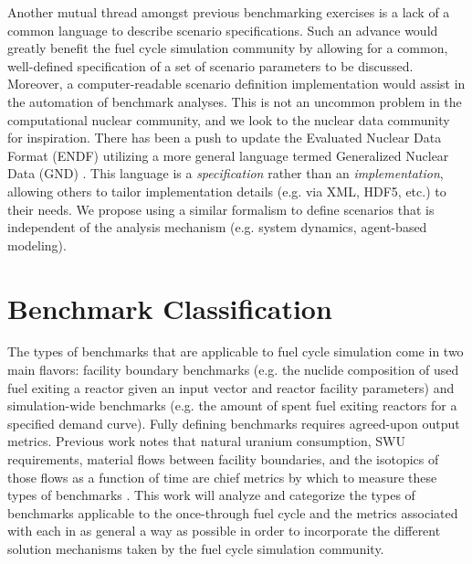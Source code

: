 \documentclass{anstrans}
\begin{document}
Another mutual thread amongst previous benchmarking exercises is a lack of a
common language to describe scenario specifications. Such an advance would
greatly benefit the fuel cycle simulation community by allowing for a common,
well-defined specification of a set of scenario parameters to be
discussed. Moreover, a computer-readable scenario definition implementation
would assist in the automation of benchmark analyses. This is not an uncommon
problem in the computational nuclear community, and we look to the nuclear data
community for inspiration. There has been a push to update the Evaluated Nuclear
Data Format (ENDF) utilizing a more general language termed Generalized Nuclear
Data (GND) \cite{mattoon_generalized_2012}. This language is a
\emph{specification} rather than an \emph{implementation}, allowing others to
tailor implementation details (e.g. via XML, HDF5, etc.) to their needs. We
propose using a similar formalism to define scenarios that is independent of the
analysis mechanism (e.g. system dynamics, agent-based modeling).

\section{Benchmark Classification}
The types of benchmarks that are applicable to fuel cycle simulation come in two
main flavors: facility boundary benchmarks (e.g. the nuclide composition of used
fuel exiting a reactor given an input vector and reactor facility parameters)
and simulation-wide benchmarks (e.g. the amount of spent fuel exiting reactors
for a specified demand curve).  Fully defining benchmarks requires agreed-upon
output metrics.  Previous work notes that natural uranium consumption, SWU
requirements, material flows between facility boundaries, and the isotopics of
those flows as a function of time are chief metrics by which to measure these
types of benchmarks \cite{boucher_specification_2008}. This work will analyze
and categorize the types of benchmarks applicable to the once-through fuel cycle
and the metrics associated with each in as general a way as possible in order to
incorporate the different solution mechanisms taken by the fuel cycle simulation
community.

\end{document}
